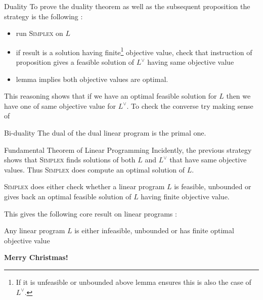 \documentclass[32pt, aspectratio = 169]{beamer}
\begin{document}
\begin{frame}{Duality}
  To prove the duality theorem as well as the subsequent proposition
  the strategy is the following :
    \begin{itemize}
        \item
          run \textsc{Simplex} on $L$
        \item
          if result is a solution having finite\footnote{If it is
            unfeasible or unbounded above lemma ensures this is also
            the case of $L^\vee$.} objective value, check that
          instruction of proposition gives a feasible solution of
          $L^\vee$ having same objective value
        \item
          lemma implies both objective values are optimal.
    \end{itemize}
    This reasoning shows that if we have an optimal feasible solution
    for $L$ then we have one of same objective value for $L^\vee$. To
    check the converse try making sense of
    \begin{halfshyblock}{Bi-duality}
        The dual of the dual linear program is the primal one.
    \end{halfshyblock}
\end{frame}

\begin{frame}{Fundamental Theorem of Linear Programming}
  Incidently, the previous strategy shows that \textsc{Simplex} finds
  solutions of both $L$ and $L^\vee$ that have same objective
  values. Thus \textsc{Simplex} does compute an optimal solution of
  $L$.
    \begin{thm}
      \textsc{Simplex} does either check whether a linear program $L$
      is feasible, unbounded or gives back an optimal feasible
      solution of $L$ having finite objective value.
    \end{thm}
    This gives the following core result on linear programs :
    \begin{cor}
      Any linear program $L$ is either infeasible, unbounded or has
      finite optimal objective value
    \end{cor}
\end{frame}


\begin{frame}
        \centering
        {\huge \textbf{Merry Christmas!}}
\end{frame}
\end{document}
